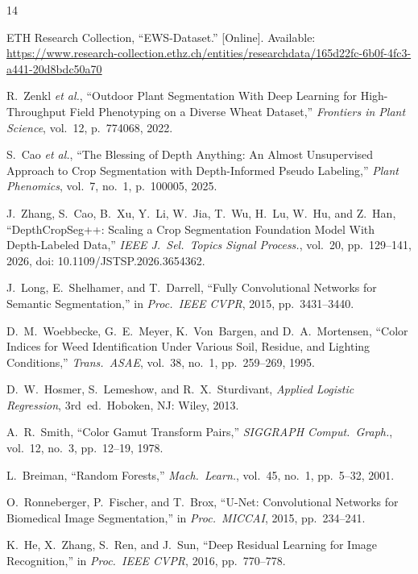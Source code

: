 \documentclass[conference]{IEEEtran}
\begin{document}
\begin{thebibliography}{14}
\sloppy

ETH Research Collection, ``EWS-Dataset.''
[Online]. Available: \url{https://www.research-collection.ethz.ch/entities/researchdata/165d22fc-6b0f-4fc3-a441-20d8bdc50a70}

R.~Zenkl \emph{et al.}, ``Outdoor Plant Segmentation With Deep Learning for
High-Throughput Field Phenotyping on a Diverse Wheat Dataset,''
\emph{Frontiers in Plant Science}, vol.~12, p.~774068, 2022.

S.~Cao \emph{et al.}, ``The Blessing of Depth Anything: An Almost
Unsupervised Approach to Crop Segmentation with Depth-Informed Pseudo
Labeling,'' \emph{Plant Phenomics}, vol.~7, no.~1, p.~100005, 2025.

J.~Zhang, S.~Cao, B.~Xu, Y.~Li, W.~Jia, T.~Wu, H.~Lu, W.~Hu, and
Z.~Han, ``DepthCropSeg++: Scaling a Crop Segmentation Foundation Model
With Depth-Labeled Data,'' \emph{IEEE J.~Sel.\ Topics Signal Process.},
vol.~20, pp.~129--141, 2026, doi: 10.1109/JSTSP.2026.3654362.

J.~Long, E.~Shelhamer, and T.~Darrell, ``Fully Convolutional Networks for
Semantic Segmentation,'' in \emph{Proc.\ IEEE CVPR}, 2015, pp.~3431--3440.

D.~M.~Woebbecke, G.~E.~Meyer, K.~Von~Bargen, and D.~A.~Mortensen,
``Color Indices for Weed Identification Under Various Soil, Residue, and
Lighting Conditions,'' \emph{Trans.\ ASAE}, vol.~38, no.~1, pp.~259--269,
1995.

D.~W.~Hosmer, S.~Lemeshow, and R.~X.~Sturdivant,
\emph{Applied Logistic Regression}, 3rd~ed.\ Hoboken, NJ: Wiley, 2013.

A.~R.~Smith, ``Color Gamut Transform Pairs,''
\emph{SIGGRAPH Comput.\ Graph.}, vol.~12, no.~3, pp.~12--19, 1978.

L.~Breiman, ``Random Forests,'' \emph{Mach.\ Learn.},
vol.~45, no.~1, pp.~5--32, 2001.

O.~Ronneberger, P.~Fischer, and T.~Brox, ``U-Net: Convolutional Networks
for Biomedical Image Segmentation,'' in \emph{Proc.\ MICCAI}, 2015,
pp.~234--241.

K.~He, X.~Zhang, S.~Ren, and J.~Sun, ``Deep Residual Learning for Image
Recognition,'' in \emph{Proc.\ IEEE CVPR}, 2016, pp.~770--778.


\end{thebibliography}
\end{document}
